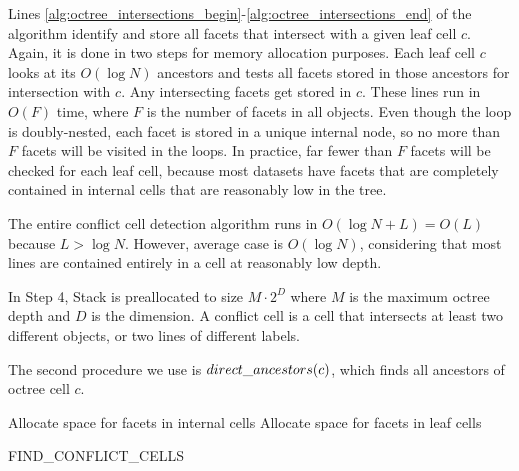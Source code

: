 \documentclass{egpubl}
\begin{document}
Lines \ref{alg:octree_intersections_begin}-\ref{alg:octree_intersections_end} of the algorithm identify and store all facets that intersect with a given leaf cell $c$. Again, it is done in two steps for memory allocation purposes. Each leaf cell $c$ looks at its $O(\log{N})$ ancestors and tests all facets stored in those ancestors for intersection with $c$. Any intersecting facets get stored in $c$. These lines run in $O(F)$ time, where $F$ is the number of facets in all objects. Even though the loop is doubly-nested, each facet is stored in a unique internal node, so no more than $F$ facets will be visited in the loops. In practice, far fewer than $F$ facets will be checked for each leaf cell, because most datasets have facets that are completely contained in internal cells that are reasonably low in the tree.

The entire conflict cell detection algorithm runs in $O(\log{N}+L) = O(L)$ because $L > \log{N}$. However, average case is $O(\log{N})$, considering that most lines are contained entirely in a cell at reasonably low depth.

In Step 4, Stack is preallocated to size $M\cdot2^D$ where $M$ is the maximum octree depth and $D$ is the dimension. A conflict cell is a cell that intersects at least two different objects, or two lines of different labels.


The second procedure we use is $direct\_ancestors(c)$, which finds all ancestors of octree cell $c$.



\algorithmspace
\begin{algorithm}
  \DontPrintSemicolon
  \LinesNumbered
  \BlankLine
  Allocate space for facets in internal cells\;
   \label{alg:octree_containing_end}
  Allocate space for facets in leaf cells\;
   \label{alg:octree_intersections_end}
\caption{FIND\_CONFLICT\_CELLS}
\label{alg:find-conflict-cells}
\end{algorithm}
\algorithmspace
\end{document}
